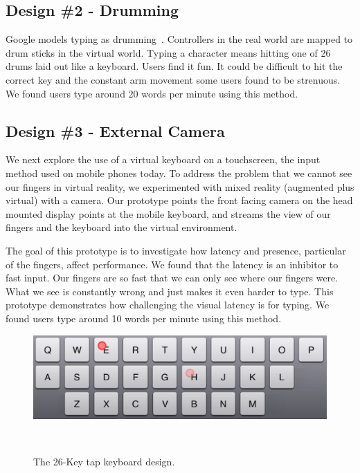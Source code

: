 \subsection{Design \#2 - Drumming}
Google models typing as drumming~\cite{google_drums}.
Controllers in the real world are mapped to drum sticks in the virtual world.  
Typing a character means hitting one of 26 drums laid out like a keyboard.
Users find it fun.
It could be difficult to hit the correct key and the constant arm movement some users found to be strenuous.
We found users type around 20 words per minute using this method.

\subsection{Design \#3 - External Camera}

We next explore the use of a virtual keyboard on a touchscreen, the input method used on mobile phones today.
To address the problem that we cannot see our fingers in virtual reality, we experimented with mixed reality (augmented plus virtual) with a camera.
Our prototype points the front facing camera on the head mounted display points at the mobile keyboard, and streams the view of our fingers and the keyboard into the virtual environment. 

The goal of this prototype is to investigate how latency and presence, particular of the fingers, affect performance.
We found that the latency is an inhibitor to fast input.
Our fingers are so fast that we can only see where our fingers were.
What we see is constantly wrong and just makes it even harder to type.
This prototype demonstrates how challenging the visual latency is for typing. 
We found users type around 10 words per minute using this method.


\begin{figure}[!htb]
  \centering

  \includegraphics[width=1\columnwidth]{figures/26-Tap}

  \caption{The 26-Key tap keyboard design.}
  ~\label{fig:multiword}
\end{figure}

